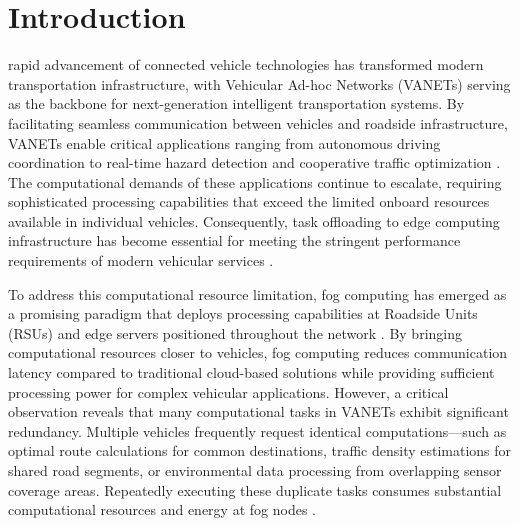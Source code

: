 \section{Introduction}

 rapid advancement of connected vehicle technologies has transformed modern transportation infrastructure, with Vehicular Ad-hoc Networks (VANETs) serving as the backbone for next-generation intelligent transportation systems. By facilitating seamless communication between vehicles and roadside infrastructure, VANETs enable critical applications ranging from autonomous driving coordination to real-time hazard detection and cooperative traffic optimization \cite{engoulou2014vanet}. The computational demands of these applications continue to escalate, requiring sophisticated processing capabilities that exceed the limited onboard resources available in individual vehicles. Consequently, task offloading to edge computing infrastructure has become essential for meeting the stringent performance requirements of modern vehicular services \cite{buttazzo1997hard}. 

To address this computational resource limitation, fog computing has emerged as a promising paradigm that deploys processing capabilities at Roadside Units (RSUs) and edge servers positioned throughout the network \cite{mouradian2017comprehensive}. By bringing computational resources closer to vehicles, fog computing reduces communication latency compared to traditional cloud-based solutions while providing sufficient processing power for complex vehicular applications. However, a critical observation reveals that many computational tasks in VANETs exhibit significant redundancy. Multiple vehicles frequently request identical computations—such as optimal route calculations for common destinations, traffic density estimations for shared road segments, or environmental data processing from overlapping sensor coverage areas. Repeatedly executing these duplicate tasks consumes substantial computational resources and energy at fog nodes \cite{wu2021design}.

